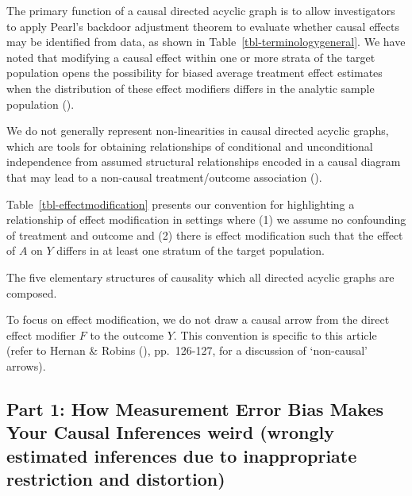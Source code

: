 \documentclass[
  single column]{article}
\begin{document}
The primary function of a causal directed acyclic graph is to allow
investigators to apply Pearl's backdoor adjustment theorem to evaluate
whether causal effects may be identified from data, as shown in
Table~\ref{tbl-terminologygeneral}. We have noted that modifying a
causal effect within one or more strata of the target population opens
the possibility for biased average treatment effect estimates when the
distribution of these effect modifiers differs in the analytic sample
population ().

We do not generally represent non-linearities in causal directed acyclic
graphs, which are tools for obtaining relationships of conditional and
unconditional independence from assumed structural relationships encoded
in a causal diagram that may lead to a non-causal treatment/outcome
association ().

Table~\ref{tbl-effectmodification} presents our convention for
highlighting a relationship of effect modification in settings where (1)
we assume no confounding of treatment and outcome and (2) there is
effect modification such that the effect of \(A\) on \(Y\) differs in at
least one stratum of the target population.

\begin{table}

\caption{\label{tbl-effectmodification}The five elementary structures of
causality which all directed acyclic graphs are composed.}

\centering{

\terminologyeffectmodification

}

\end{table}%

To focus on effect modification, we do not draw a causal arrow from the
direct effect modifier \(F\) to the outcome \(Y\). This convention is
specific to this article (refer to Hernan \& Robins
(), pp.~126-127, for a discussion
of `non-causal' arrows).

\subsection{\texorpdfstring{Part 1: How Measurement Error Bias Makes
Your Causal Inferences \textbf{weird} (\textbf{w}rongly
\textbf{e}stimated inferences due to \textbf{i}nappropriate
\textbf{r}estriction and
\textbf{d}istortion)}{Part 1: How Measurement Error Bias Makes Your Causal Inferences weird (wrongly estimated inferences due to inappropriate restriction and distortion)}}\label{id-sec-1}
\end{document}
